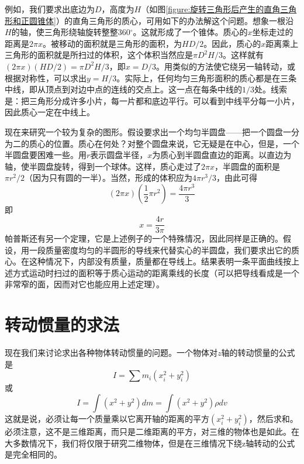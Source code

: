 例如，我们要求出底边为$D$，高度为$H$（如图\ref{figure:旋转三角形后产生的直角三角形和正圆锥体}）的直角三角形的质心，可用如下的办法解这个问题。想象一根沿$H$的轴，使三角形绕轴旋转整整360$^\circ$。这就形成了一个锥体。质心的$x$坐标走过的距离是$2\pi x$。被移动的面积就是三角形的面积，为$HD/2$。因此，质心的$x$距离乘上三角形的面积就是所扫过的体积，这个体积当然应是$\pi D^2H/3$。这样就有$(2\pi x)(HD/2)=\pi D^2H/3$，即$x=D/3$。用类似的方法使它绕另一轴转动，或根据对称性，可以求出$y=H/3$。实际上，任何均匀三角形面积的质心都是在三条中线，即从顶点到对边中点的连线的交点上。这一点在每条中线的$1/3$处。线索是：把三角形分成许多小片，每一片都和底边平行。可以看到中线平分每一小片，因此质心一定在中线上。

现在来研究一个较为复杂的图形。假设要求出一个均匀半圆盘——把一个圆盘一分为二的质心的位置。质心在何处？对整个圆盘来说，它无疑是在中心，但是，一个半圆盘要困难一些。用$r$表示圆盘半径，$x$为质心到半圆盘直边的距离。以直边为轴，使半圆盘旋转，得到一个球体。这样，质心走过了$2\pi x$，半圆盘的面积是$\pi r^2/2$（因为只有圆的一半）。当然，形成的体积应为$4\pi r^3/3$，由此可得
\begin{equation*}
    (2\pi x)\left (\frac{1}{2} \pi r^2 \right ) = \frac{4 \pi r^3}{3}
\end{equation*}
即
\begin{equation*}
    x=\frac{4r}{3\pi}
\end{equation*}
帕普斯还有另一个定理，它是上述例子的一个特殊情况，因此同样是正确的。假设，用一段质量密度均匀的半圆形的导线来代替实心的半圆盘，我们要求出它的质心。在这种情况下，内部没有质量，质量都在导线上。结果表明一条平面曲线按上述方式运动时扫过的面积等于质心运动的距离乘线的长度（可以把导线看成是一个非常窄的面，因而对它也能应用上述定理）。

\section{转动惯量的求法}

现在我们来讨论求出各种物体转动惯量的问题。一个物体对$z$轴的转动惯量的公式是
\begin{equation*}
    I=\sum m_i (x_i^2+y_i^2)
\end{equation*}
或
\begin{equation}
    \label{Eq:I:19:4}
    I=\int (x^2+y^2)dm = \int (x^2+y^2)\rho dv
\end{equation}
这就是说，必须让每一个质量乘以它离开轴的距离的平方$(x_i^2+y_i^2)$，然后求和。必须注意，这不是三维距离，而只是二维距离的平方，对三维的物体也是如此。在大多数情况下，我们将仅限于研究二维物体，但是在三维情况下绕z轴转动的公式是完全相同的。

